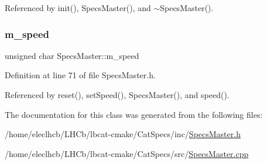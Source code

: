 Referenced by init(), Specs\+Master(), and $\sim$\+Specs\+Master().

\mbox{\label{classSpecsMaster_af75996281787299ccd92555512802814}} 
\subsubsection{\texorpdfstring{m\+\_\+speed}{m\_speed}}
{\footnotesize\ttfamily unsigned char Specs\+Master\+::m\+\_\+speed\hspace{0.3cm}{\ttfamily [private]}}



Definition at line 71 of file Specs\+Master.\+h.



Referenced by reset(), set\+Speed(), Specs\+Master(), and speed().



The documentation for this class was generated from the following files\+:\begin{DoxyCompactItemize}
\item 
/home/eleclhcb/\+L\+H\+Cb/lbcat-\/cmake/\+Cat\+Specs/inc/\hyperlink{SpecsMaster_8h}{Specs\+Master.\+h}\item 
/home/eleclhcb/\+L\+H\+Cb/lbcat-\/cmake/\+Cat\+Specs/src/\hyperlink{SpecsMaster_8cpp}{Specs\+Master.\+cpp}\end{DoxyCompactItemize}
